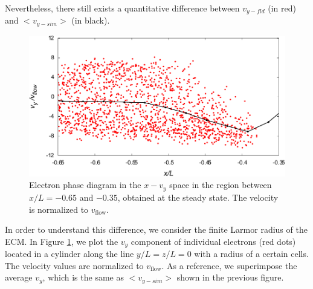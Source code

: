 \documentclass[draft,jgrga]{agutex2015}
\begin{document}
\begin{article}
Nevertheless, there still exists a quantitative difference between 
$v_{y-fld}$ (in red) and $<v_{y-sim}>$ (in black).
\begin{figure}
\centering
\noindent\includegraphics[width=15cm]{./figures/Fig_9_bb-crop.pdf}
\caption{
Electron phase diagram in the $x-v_{y}$ space in the region between $x/L =-0.65$ and $-0.35$,
obtained at the steady state.
The velocity is normalized to $v_\mathrm{flow}$.
}
\label{fig:9}
\end{figure}
In order to understand this difference, 
we consider the finite Larmor radius of the ECM. 
In Figure \ref{fig:9}, 
we plot the $v_y$ component of individual electrons (red dots)
located in a cylinder along the line $y/L=z/L=0$ with a radius of a certain cells. 
The velocity values are normalized to $v_\mathrm{flow}$.
As a reference, 
we superimpose the average $v_y$, which is the same as $<v_{y-sim}>$ 
shown in the previous figure.
%


\end{article}
\end{document}
